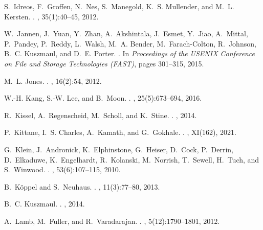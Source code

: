 \documentclass[11pt,dvipdfmx]{article}
\begin{document}
\begin{thebibliography}{10}
\begin{small}
  S.~Idreos, F.~Groffen, N.~Nes, S.~Manegold, K.~S. Mullender, and M.~L. Kersten.
  .
  , 35(1):40--45, 2012.
  
  W.~Jannen, J.~Yuan, Y.~Zhan, A.~Akshintala, J.~Esmet, Y.~Jiao, A.~Mittal,
    P.~Pandey, P.~Reddy, L.~Walsh, M.~A. Bender, M.~Farach-Colton, R.~Johnson,
    B.~C. Kuszmaul, and D.~E. Porter.
  .
  \newblock In {\em Proceedings of the USENIX Conference on File and Storage
    Technologies (FAST)}, pages 301--315, 2015.
  
  M.~L. Jones.
  .
  , 16(2):54, 2012.
  
  W.-H. Kang, S.-W. Lee, and B.~Moon.
  .
  , 25(5):673--694, 2016.
  
  R.~Kissel, A.~Regenscheid, M.~Scholl, and K.~Stine.
  .
  , 2014.
  
  P.~Kittane, I.~S. Charles, A.~Kamath, and G.~Gokhale.
  .
  , XI(162), 2021.
  
  G.~Klein, J.~Andronick, K.~Elphinstone, G.~Heiser, D.~Cock, P.~Derrin,
    D.~Elkaduwe, K.~Engelhardt, R.~Kolanski, M.~Norrish, T.~Sewell, H.~Tuch, and
    S.~Winwood.
  .
  , 53(6):107--115, 2010.
  
  B.~K{\"{o}}ppel and S.~Neuhaus.
  .
  , 11(3):77--80, 2013.
  
  B.~C. Kuszmaul.
  .
  , 2014.
  
  A.~Lamb, M.~Fuller, and R.~Varadarajan.
  .
  , 5(12):1790--1801, 2012.
  

\end{small}
\end{thebibliography}
\end{document}
